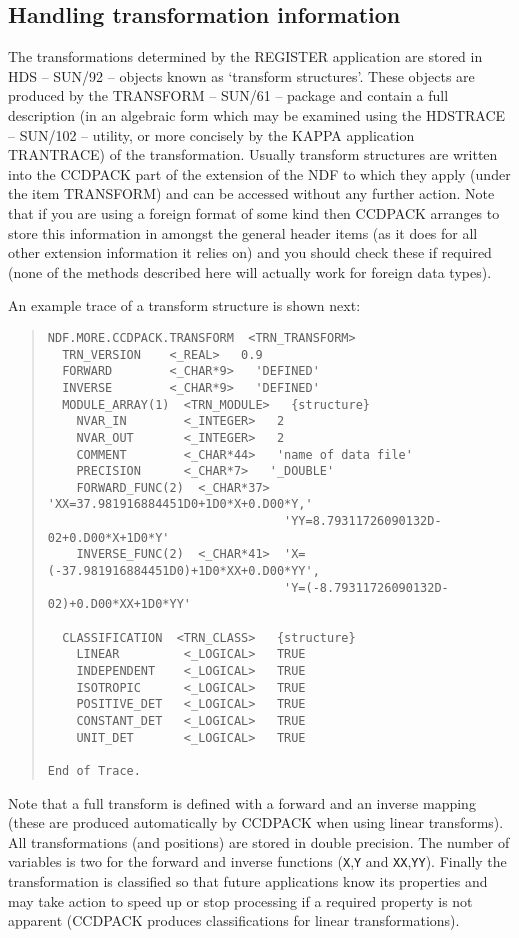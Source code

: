 \documentclass[twoside,11pt]{article}
\newcommand{\htmlref}[2]{#1}
\newcommand{\xref}[3]{#1}
\newcommand{\xlabel}[1]{}
\renewcommand{\_}{\texttt{\symbol{95}}}
\newenvironment{myquote}{\begin{quote}\begin{small}}{\end{small}\end{quote}}
\newcommand{\text}[1]{{\small \tt #1}}
\newcommand{\xroutine}[1]{\htmlref{{\sc #1}}{#1}}
\begin{document}
\subsection{\xlabel{handlingtransforms}Handling transformation information
            \label{handling_transforms}}
The transformations determined by the \xroutine{REGISTER} application
are stored in \xref{HDS -- SUN/92 --}{sun92}{} objects known as
`transform structures'. These objects are produced by the
\xref{TRANSFORM -- SUN/61 --}{sun61}{} package and contain a full
description (in an algebraic form which may be examined using the
\xref{HDSTRACE -- SUN/102 --}{sun102}{} utility, or more concisely by
the \xref{KAPPA}{sun95}{} application
\xref{TRANTRACE}{sun95}{TRANTRACE}) of the transformation.  Usually
transform structures are written into the CCDPACK part of the
extension of the NDF to which they apply (under the item TRANSFORM)
and can be accessed without any further action. Note that if you
are using a foreign format of some kind then CCDPACK arranges
to store this information in amongst the general header items
(as it does for all other extension information it relies on)
and you should check these if required (none of the methods described
here will actually work for foreign data types).

An example trace of a transform structure is shown next:
\begin{myquote}
\begin{verbatim}
NDF.MORE.CCDPACK.TRANSFORM  <TRN_TRANSFORM>
  TRN_VERSION    <_REAL>   0.9
  FORWARD        <_CHAR*9>   'DEFINED'
  INVERSE        <_CHAR*9>   'DEFINED'
  MODULE_ARRAY(1)  <TRN_MODULE>   {structure}
    NVAR_IN        <_INTEGER>   2
    NVAR_OUT       <_INTEGER>   2
    COMMENT        <_CHAR*44>   'name of data file'
    PRECISION      <_CHAR*7>   '_DOUBLE'
    FORWARD_FUNC(2)  <_CHAR*37>  'XX=37.981916884451D0+1D0*X+0.D00*Y,'
                                 'YY=8.79311726090132D-02+0.D00*X+1D0*Y'
    INVERSE_FUNC(2)  <_CHAR*41>  'X=(-37.981916884451D0)+1D0*XX+0.D00*YY',
                                 'Y=(-8.79311726090132D-02)+0.D00*XX+1D0*YY'

  CLASSIFICATION  <TRN_CLASS>   {structure}
    LINEAR         <_LOGICAL>   TRUE
    INDEPENDENT    <_LOGICAL>   TRUE
    ISOTROPIC      <_LOGICAL>   TRUE
    POSITIVE_DET   <_LOGICAL>   TRUE
    CONSTANT_DET   <_LOGICAL>   TRUE
    UNIT_DET       <_LOGICAL>   TRUE

End of Trace.
\end{verbatim}
\end{myquote}
Note that a full transform is defined with a forward and an inverse
mapping (these are produced automatically by CCDPACK when using linear
transforms). All transformations (and positions) are stored in double
precision. The number of variables is two for the forward and inverse
functions (\text{X},\text{Y} and \text{XX},\text{YY}). Finally
the transformation is classified so that future applications know its
properties and may take action to speed up or stop processing if a
required property is not apparent (CCDPACK produces classifications for
linear transformations).
\end{document}

